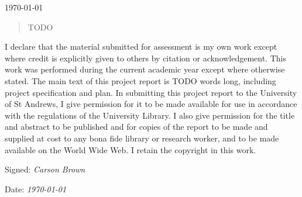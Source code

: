 \documentclass[
12pt, %
oneside, %
english, %
singlespacing, %
liststotoc, %
toctotoc, %
headsepline, %
]{MastersDoctoralThesis} %
\begin{document}
\begin{titlepage}
\begin{center}

{\large \today} %

\vfill

\end{center}
\end{titlepage}



\begin{abstract}
	TODO
\end{abstract}


\begin{declaration}
I declare that the material submitted for assessment is my own work except where credit is explicitly given to others by citation or acknowledgement. This work was performed during the current academic year except where otherwise stated. The main text of this project report is TODO words long, including project specification and plan. In submitting this project report to the University of St Andrews, I give permission for it to be made available for use in accordance with the regulations of the University Library. I also give permission for the title and abstract to be published and for copies of the report to be made and supplied at cost to any bona fide library or research worker, and to be made available on the World Wide Web. I retain the copyright in this work.

\noindent Signed: \textit{Carson Brown}

\noindent Date: \textit{\today}
\end{declaration}

\end{document}
